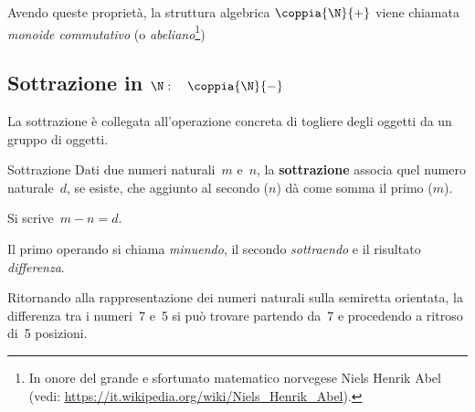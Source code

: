 Avendo queste proprietà, la struttura algebrica \(\coppia{\N}{+}\) 
\indc{\(\N\)}{\(\coppia{\N}{+}\)}viene 
chiamata \emph{monoide commutativo} (o \emph{abeliano}\footnote{
In onore del grande e sfortunato matematico norvegese Niels Henrik Abel\\ 
(vedi: \url{https://it.wikipedia.org/wiki/Niels_Henrik_Abel}).})


\subsection{Sottrazione in 
\texorpdfstring{$\N: \quad \coppia{\N}{-}$}{N: (N; -)}}

La sottrazione è collegata all'operazione concreta di togliere degli 
oggetti da un gruppo di oggetti.

\begin{definizione}{Sottrazione}{}
Dati due numeri naturali~\(m\) e~\(n\), la \textbf{sottrazione} associa 
quel numero naturale~\(d\), se esiste, che aggiunto al secondo (\(n\)) 
dà come somma il primo (\(m\)).

Si scrive~\(m - n = d\).

Il primo operando si chiama \emph{minuendo}, il secondo \emph{sottraendo} e 
il risultato \emph{differenza}.
\end{definizione}

% 
Ritornando alla rappresentazione dei numeri naturali sulla semiretta 
orientata, la differenza tra i numeri~7 e~5 si può trovare partendo da~7 e 
procedendo a ritroso di~5 posizioni.

